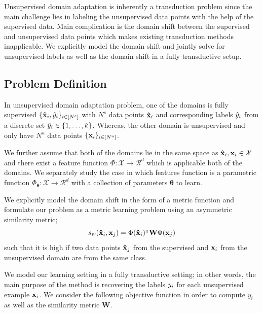 Unsupervised domain adaptation is inherently a transduction problem since the main challenge lies in labeling the unsupervised data points with the help of the supervised data. Main complication is the domain shift between the supervised and unsupervised data points which makes existing transduction methods inapplicable. We explicitly model the domain shift and jointly solve for unsupervised labels as well as the domain shift in a fully transductive setup.

\subsection{Problem Definition}
In unsupervised domain adaptation problem, one of the domains is fully supervised $\{\mathbf{\hat{x}}_i, \hat{y}_i \}_{i \in [N^s]}$ with $N^s$ data points $\mathbf{\hat{x}}_i$ and corresponding labels $\hat{y}_i$ from a discrete set $\hat{y}_i \in \{1,\ldots, k \}$. Whereas, the other domain is unsupervised and only have $N^u$ data points $\{\mathbf{x}_i \}_{i \in [N^u]}$. 


We further assume that both of the domains lie in the same space as $\mathbf{\hat{x}}_i,\mathbf{x}_i \in \mathcal{X}$ and there exist a feature function \mbox{$\Phi:\mathcal{X}\rightarrow \mathcal{R}^d$} which is applicable both of the domains. We separately study the case in which features function is a parametric function \mbox{$\Phi_\mathbf{\theta}:\mathcal{X}\rightarrow \mathcal{R}^d$} with a collection of parameters $\mathbf{\theta}$ to learn.

We explicitly model the domain shift in the form of a metric function and formulate our problem as a metric learning problem using an asymmetric similarity metric;
\begin{equation}
\sw(\xsi,\xuj) = \Phi(\xsi)^\intercal \mathbf{W} \Phi(\xuj)
\end{equation}
such that it is high if two data points $\mathbf{\hat{x}}_j$ from the supervised and $\mathbf{x}_i$ from the unsupervised domain are from the same class.

We model our learning setting in a fully transductive setting; in other words, the main purpose of the method is recovering the labels $y_i$ for each unsupervised example $\mathbf{x}_i$. We consider the following objective function in order to compute $y_i$ as well as the similarity metric $\mathbf{W}$.

